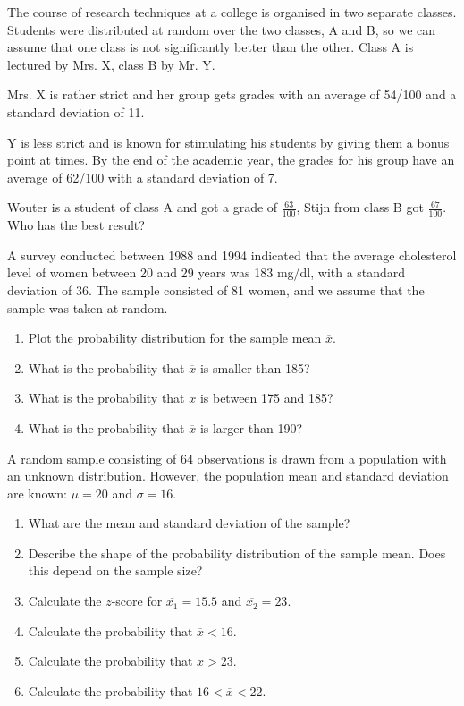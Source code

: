 \begin{exercise}

  The course of research techniques at a college is organised in two separate classes. 
  Students were distributed at random over the two classes, A and B, so we can assume that one class is not significantly better than the other. 
  Class A is lectured by Mrs. X, class B by Mr. Y.

  Mrs. X is rather strict and her group gets grades with an average of 54/100 and a standard deviation of 11.

  Y is less strict and is known for stimulating his students by giving them a bonus point at times. By the end of the academic year, the grades for his group have an average of 62/100 with a standard deviation of 7.

  Wouter is a student of class A and got a grade of $\frac{63}{100}$, Stijn from class B got $\frac{67}{100}$. Who has the best result?
\end{exercise}

\begin{exercise}
  A survey conducted between 1988 and 1994 indicated that the average cholesterol level of women between 20 and 29 years was 183 mg/dl, with a standard deviation of 36. 
  The sample consisted of 81 women, and we assume that the sample was taken at random.

  \begin{enumerate}[label=\alph*.]
    \item Plot the probability distribution for the sample mean $\overline{x}$.
    \item What is the probability that $\overline{x}$ is smaller than 185?
    \item What is the probability that $\overline{x}$ is between 175 and 185?
    \item What is the probability that $\overline{x}$ is larger than 190? 
  \end{enumerate}
\end{exercise}

\begin{exercise}
  A random sample consisting of 64 observations is drawn from a population with an unknown distribution. 
  However, the population mean and standard deviation are known: $\mu = 20$ and $\sigma = 16$.

  \begin{enumerate}[label=\alph*.]
    \item What are the mean and standard deviation of the sample?
    \item Describe the shape of the probability distribution of the sample mean. Does this depend on the sample size?
    \item Calculate the $z$-score for $\overline{x_{1}} = 15.5$ and $\overline{x_{2}} = 23$.
    \item Calculate the probability that $\overline{x} < 16$.
    \item Calculate the probability that $\overline{x} > 23$.
    \item Calculate the probability that $16 < \overline{x} < 22$.
  \end{enumerate}
\end{exercise}

